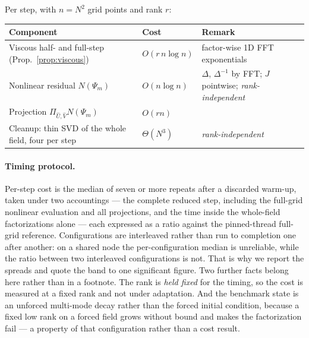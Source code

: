 Per step, with $n = N^2$ grid points and rank $r$:
\begin{center}
\begin{tabular}{lll}
  \toprule
  Component & Cost & Remark \\
  \midrule
  Viscous half- and full-step (Prop.~\ref{prop:viscous}) & $O(r\, n \log n)$
    & factor-wise 1D FFT exponentials \\
  Nonlinear residual $N(\Psi_m)$ & $O(n \log n)$
    & $\Delta$, $\Delta^{-1}$ by FFT; $J$ pointwise;
    \emph{rank-independent} \\
  Projection $\Pi_{\hat U, \hat V} N(\Psi_m)$ & $O(r n)$ & \\
  Cleanup: thin SVD of the whole field, four per step & $\Theta(N^3)$ &
    \emph{rank-independent} \\
  \bottomrule
\end{tabular}
\end{center}

\paragraph{Timing protocol.} Per-step cost is the median of seven or more
repeats after a discarded warm-up, taken under two accountings --- the complete
reduced step, including the full-grid nonlinear evaluation and all projections,
and the time inside the whole-field factorizations alone --- each expressed as a
ratio against the pinned-thread full-grid reference. Configurations are
interleaved rather than run to completion one after another: on a shared node the
per-configuration median is unreliable, while the ratio between two interleaved
configurations is not. That is why we report the spreads and quote the band to one
significant figure. Two further facts belong here rather than in a footnote. The
rank is \emph{held fixed} for the timing, so the cost is measured at a fixed rank
and not under adaptation. And the benchmark state is an unforced multi-mode decay
rather than the forced initial condition, because a fixed low rank on a forced
field grows without bound and makes the factorization fail --- a property of that
configuration rather than a cost result.


